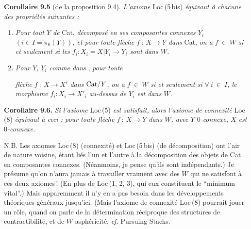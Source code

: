 \textbf{Corollaire 9.5} (de la proposition 9.4). \textit{L'axiome} Loc\,(5\,bis) \textit{équivaut à chacune des propriétés suivantes :}
\begin{enumerate}[label={}, leftmargin=3em]
\item[\cercle{a}] \textit{Pour tout $Y$ de} Cat, \textit{décomposé en ses composantes connexes $Y_i$ $(i\in I=\pi_0(Y))$, et pour toute flèche $f\ :\ X\longrightarrow Y$ dans} Cat, \textit{on a $f\ \in\ W$ si et seulement si les $f_i : X_i=X|Y_i\longrightarrow Y_i$ sont dans $W$.}
\item[\cercle{b}] \textit{Pour $Y$, $Y_i$ comme dans} , \textit{pour toute}


\textit{flèche $f\ :\ X\longrightarrow X'$ dans $\mathrm{Cat}/Y$, on a $f\ \in\ W$ si et seulement si $\forall\ i\ \in\ I$, le morphisme $f_i : X_i\longrightarrow X'_i$ au-dessus de $Y_i$ est dans $W$.}
\end{enumerate}

\textbf{Corollaire 9.6.} \textit{Si l'axiome} Loc\,(5) \textit{est satisfait, alors l'axiome de connexité} Loc\,(8) \textit{équivaut à ceci : pour toute flèche $f\ :\ X\longrightarrow Y$ dans $W$, avec $Y$ $0$-connexe, $X$ est $0$-connexe.}


N.B. Les axiomes Loc\,(8) (connexité) et Loc\,(5\,bis) (de décomposition) ont l'air de nature voisine, étant liés l'un et l'autre à la décomposition des objets de Cat en composantes connexes. (Néanmoins, je pense qu'ils sont indépendants.) Je présume qu'on n'aura jamais à travailler vraiment avec des $W$ qui ne satisfont à ces deux axiomes\,! (En plus de Loc\,(1, 2, 3), qui eux constituent le “minimum vital”.) Mais apparemment il n'y en a pas besoin dans les développements théoriques généraux jusqu'ici. (Mais l'axiome de connexité Loc\,(8) pourrait jouer un rôle, quand on parle de la détermination réciproque des structures de contractibilité, et de $W$-asphéricité, \textit{cf.} Pursuing Stacks. %



